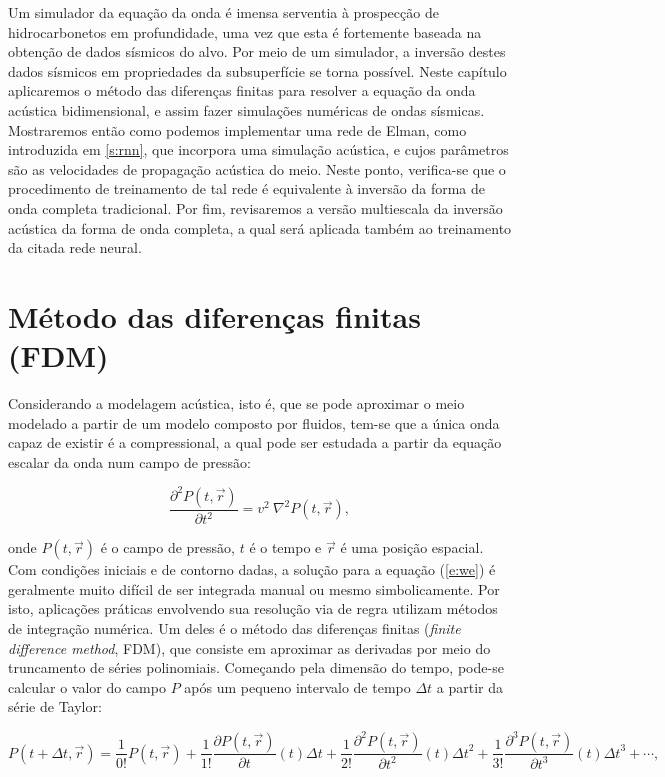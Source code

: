   Um simulador da equação da onda é imensa serventia à prospecção de hidrocarbonetos em profundidade, uma vez que esta é fortemente baseada na obtenção de dados sísmicos do alvo. Por meio de um simulador, a inversão destes dados sísmicos em propriedades da subsuperfície se torna possível. Neste capítulo aplicaremos o método das diferenças finitas para resolver a equação da onda acústica bidimensional, e assim fazer simulações numéricas de ondas sísmicas. Mostraremos então como podemos implementar uma rede de Elman, como introduzida em \ref{s:rnn}, que incorpora uma simulação acústica, e cujos parâmetros são as velocidades de propagação acústica do meio. Neste ponto, verifica-se que o procedimento de treinamento de tal rede é equivalente à inversão da forma de onda completa tradicional. Por fim, revisaremos a versão multiescala da inversão acústica da forma de onda completa, a qual será aplicada também ao treinamento da citada rede neural.

  \section{Método das diferenças finitas (FDM)}  \label{s:fdm}

    Considerando a modelagem acústica, isto é, que se pode aproximar o meio modelado a partir de um modelo composto por fluidos, tem-se que a única onda capaz de existir é a compressional, a qual pode ser estudada a partir da equação escalar da onda num campo de pressão:

    \begin{equation} \label{e:we}
      \frac{\partial^2 P(t,\vec{r})}{\partial t^2} = v^2\ \nabla^2 P(t,\vec{r})
      ,
    \end{equation}

    \noindent onde $P(t,\vec{r})$ é o campo de pressão, $t$ é o tempo e $\vec{r}$ é uma posição espacial. Com condições iniciais e de contorno dadas, a solução para a equação (\ref{e:we}) é geralmente muito difícil de ser integrada manual ou mesmo simbolicamente. Por isto, aplicações práticas envolvendo sua resolução via de regra utilizam métodos de integração numérica. Um deles é o método das diferenças finitas (\textit{finite difference method}, FDM), que consiste em aproximar as derivadas por meio do truncamento de séries polinomiais. Começando pela dimensão do tempo, pode-se calcular o valor do campo $P$ após um pequeno intervalo de tempo $\Delta t$ a partir da série de Taylor:

    \begin{equation} \label{e:serie_p_depois_de_dt}
      P(t+{\Delta t}, \vec{r}) =
        \frac{1}{0!} P(t, \vec{r})
        + \frac{1}{1!} \frac{\partial P(t, \vec{r})}{\partial t}(t) {\Delta t}
        + \frac{1}{2!} \frac{\partial^2 P(t, \vec{r})}{\partial t^2}(t) {\Delta t}^2
        + \frac{1}{3!} \frac{\partial^3 P(t, \vec{r})}{\partial t^3}(t) {\Delta t}^3
        + \cdots
        ,
    \end{equation}


